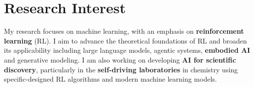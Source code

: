 
\section{Research Interest}

My research focuses on machine learning, with an emphasis on \textbf{reinforcement learning} (RL). I aim to advance the theoretical foundations of RL and broaden its applicability including large language models, agentic systems, \textbf{embodied AI} and generative modeling. I am also working on developing \textbf{AI for scientific discovery}, particularly in the \textbf{self-driving laboratories} in chemistry using specific-designed RL algorithms and modern machine learning models. 
